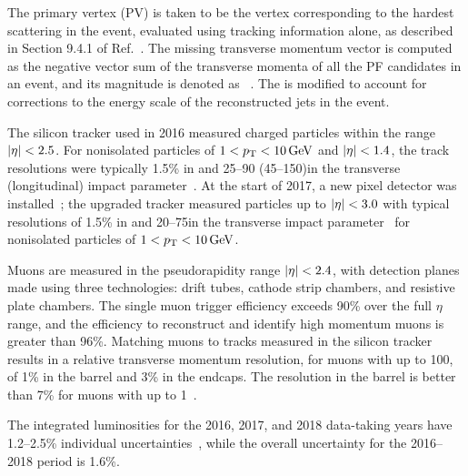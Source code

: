The primary vertex (PV) is taken to be the vertex corresponding to the hardest scattering in the event, evaluated using tracking information alone, as described in Section 9.4.1 of Ref.~\cite{CMS-TDR-15-02}. The missing transverse momentum vector \ptvecmiss is computed as the negative vector sum of the transverse momenta of all the PF candidates in an event, and its magnitude is denoted as \ptmiss~\cite{CMS:2019ctu}. The \ptvecmiss is modified to account for corrections to the energy scale of the reconstructed jets in the event.

The silicon tracker used in 2016 measured charged particles within the range $\abs{\eta} < 2.5$. For nonisolated particles of $1 < p_{\mathrm{T}} < 10\,\text{Ge\hspace{-.08em}V}$ and $\abs{\eta} < 1.4$, the track resolutions were typically 1.5\% in \pt and 25--90 (45--150)\mum in the transverse (longitudinal) impact parameter~\cite{CMS:2014pgm}. At the start of 2017, a new pixel detector was installed~\cite{Phase1Pixel}; the upgraded tracker measured particles up to $\abs{\eta} < 3.0$ with typical resolutions of 1.5\% in \pt and 20--75\mum in the transverse impact parameter~\cite{DP-2020-049} for nonisolated particles of $1 < p_{\mathrm{T}} < 10\,\text{Ge\hspace{-.08em}V}$.

Muons are measured in the pseudorapidity range $\abs{\eta} < 2.4$, with detection planes made using three technologies: drift tubes, cathode strip chambers, and resistive plate chambers. The single muon trigger efficiency exceeds 90\% over the full $\eta$ range, and the efficiency to reconstruct and identify high momentum muons is greater than 96\%. Matching muons to tracks measured in the silicon tracker results in a relative transverse momentum resolution, for muons with \pt up to 100\GeV, of 1\% in the barrel and 3\% in the endcaps. The \pt resolution in the barrel is better than 7\% for muons with \pt up to 1\TeV~\cite{CMS:2018rym}.


The integrated luminosities for the 2016, 2017, and 2018 data-taking years have 1.2--2.5\% individual uncertainties~\cite{CMS-LUM-17-003,CMS-PAS-LUM-17-004,CMS-PAS-LUM-18-002}, while the overall uncertainty for the 2016--2018 period is 1.6\%.

